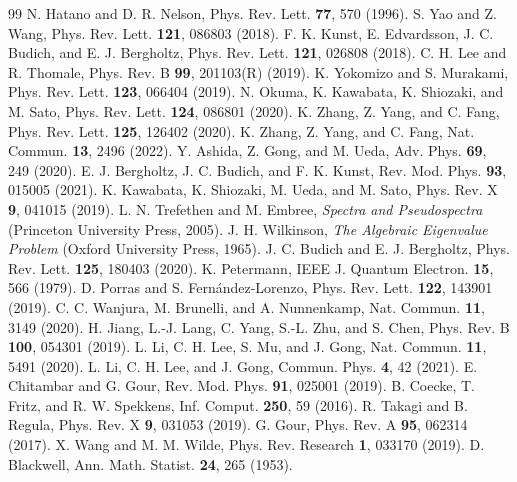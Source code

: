 \documentclass[11pt]{article}
\theoremstyle{definition}
\theoremstyle{remark}
\begin{document}
{\small
\begin{thebibliography}{99}
\setlength{\itemsep}{1pt}
 N. Hatano and D. R. Nelson, Phys. Rev. Lett. \textbf{77}, 570 (1996).
 S. Yao and Z. Wang, Phys. Rev. Lett. \textbf{121}, 086803 (2018).
 F. K. Kunst, E. Edvardsson, J. C. Budich, and E. J. Bergholtz, Phys. Rev. Lett. \textbf{121}, 026808 (2018).
 C. H. Lee and R. Thomale, Phys. Rev. B \textbf{99}, 201103(R) (2019).
 K. Yokomizo and S. Murakami, Phys. Rev. Lett. \textbf{123}, 066404 (2019).
 N. Okuma, K. Kawabata, K. Shiozaki, and M. Sato, Phys. Rev. Lett. \textbf{124}, 086801 (2020).
 K. Zhang, Z. Yang, and C. Fang, Phys. Rev. Lett. \textbf{125}, 126402 (2020).
 K. Zhang, Z. Yang, and C. Fang, Nat. Commun. \textbf{13}, 2496 (2022).
 Y. Ashida, Z. Gong, and M. Ueda, Adv. Phys. \textbf{69}, 249 (2020).
 E. J. Bergholtz, J. C. Budich, and F. K. Kunst, Rev. Mod. Phys. \textbf{93}, 015005 (2021).
 K. Kawabata, K. Shiozaki, M. Ueda, and M. Sato, Phys. Rev. X \textbf{9}, 041015 (2019).
 L. N. Trefethen and M. Embree, \emph{Spectra and Pseudospectra} (Princeton University Press, 2005).
 J. H. Wilkinson, \emph{The Algebraic Eigenvalue Problem} (Oxford University Press, 1965).
 J. C. Budich and E. J. Bergholtz, Phys. Rev. Lett. \textbf{125}, 180403 (2020).
 K. Petermann, IEEE J. Quantum Electron. \textbf{15}, 566 (1979).
 D. Porras and S. Fern\'andez-Lorenzo, Phys. Rev. Lett. \textbf{122}, 143901 (2019).
 C. C. Wanjura, M. Brunelli, and A. Nunnenkamp, Nat. Commun. \textbf{11}, 3149 (2020).
 H. Jiang, L.-J. Lang, C. Yang, S.-L. Zhu, and S. Chen, Phys. Rev. B \textbf{100}, 054301 (2019).
 L. Li, C. H. Lee, S. Mu, and J. Gong, Nat. Commun. \textbf{11}, 5491 (2020).
 L. Li, C. H. Lee, and J. Gong, Commun. Phys. \textbf{4}, 42 (2021).
 E. Chitambar and G. Gour, Rev. Mod. Phys. \textbf{91}, 025001 (2019).
 B. Coecke, T. Fritz, and R. W. Spekkens, Inf. Comput. \textbf{250}, 59 (2016).
 R. Takagi and B. Regula, Phys. Rev. X \textbf{9}, 031053 (2019).
 G. Gour, Phys. Rev. A \textbf{95}, 062314 (2017).
 X. Wang and M. M. Wilde, Phys. Rev. Research \textbf{1}, 033170 (2019).
 D. Blackwell, Ann. Math. Statist. \textbf{24}, 265 (1953).

\end{thebibliography}}
\end{document}
